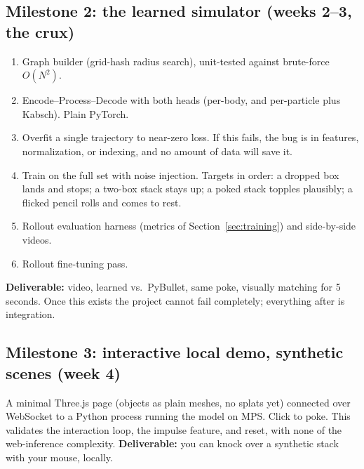 \documentclass[11pt]{article}
\begin{document}
\subsection{Milestone 2: the learned simulator (weeks 2--3, the crux)}
\begin{enumerate}[itemsep=2pt]
  \item Graph builder (grid-hash radius search), unit-tested against brute-force $O(N^2)$.
  \item Encode--Process--Decode with both heads (per-body, and per-particle plus Kabsch). Plain PyTorch.
  \item Overfit a single trajectory to near-zero loss. If this fails, the bug is in features, normalization, or indexing, and no amount of data will save it.
  \item Train on the full set with noise injection. Targets in order: a dropped box lands and stops; a two-box stack stays up; a poked stack topples plausibly; a flicked pencil rolls and comes to rest.
  \item Rollout evaluation harness (metrics of Section~\ref{sec:training}) and side-by-side videos.
  \item Rollout fine-tuning pass.
\end{enumerate}
\textbf{Deliverable:} video, learned vs.\ PyBullet, same poke, visually matching for 5 seconds. Once this exists the project cannot fail completely; everything after is integration.

\subsection{Milestone 3: interactive local demo, synthetic scenes (week 4)}
A minimal Three.js page (objects as plain meshes, no splats yet) connected over WebSocket to a Python process running the model on MPS. Click to poke. This validates the interaction loop, the impulse feature, and reset, with none of the web-inference complexity.
\textbf{Deliverable:} you can knock over a synthetic stack with your mouse, locally.
\end{document}
